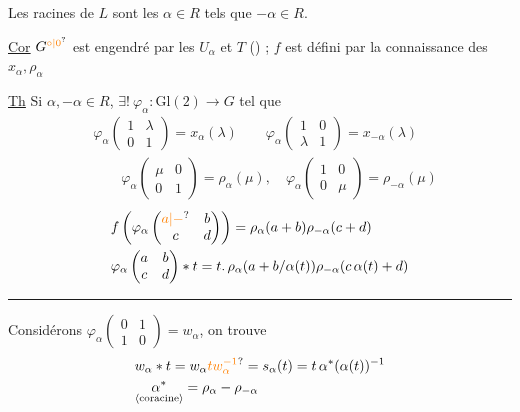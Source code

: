 Les racines de $L$ sont les $\alpha\in R$ tels que $-\alpha\in R$.

\uline{Cor}  $G^{\unsure{\circ|0}}$ est engendré par les $U_\alpha$ et $T$ () ; $f$ est défini  par la connaissance des $x_\alpha,\rho_\alpha$

\uline{Th} Si $\alpha,-\alpha\in R$, $\exists !\ \varphi_\alpha:\mathrm{Gl}(2)\longrightarrow G$ tel que
\[
\begin{aligned}
&\varphi_\alpha\begin{pmatrix}1&\lambda\\0&1\end{pmatrix}=x_\alpha(\lambda)
 \qquad \varphi_\alpha\begin{pmatrix}1&0\\\lambda&1\end{pmatrix}=x_{-\alpha}(\lambda)\\
&\qquad\varphi_\alpha\begin{pmatrix}\mu&0\\0&1\end{pmatrix}=\rho_\alpha(\mu),\quad
\varphi_\alpha\begin{pmatrix}1&0\\0&\mu\end{pmatrix}=\rho_{-\alpha}(\mu)
\end{aligned}
\]
\[
\begin{aligned}
&f\left(\varphi_\alpha\begin{pmatrix}\unsure{a|-}&b\\c&d\end{pmatrix}\right)
=\rho_\alpha(a+b)\rho_{-\alpha}(c+d)\\
&\varphi_\alpha\begin{pmatrix}a&b\\c&d\end{pmatrix}*t
=t.\,\rho_\alpha(a+b/\alpha(t))\rho_{-\alpha}(c\,\alpha(t)+d)
\end{aligned}
\]
\begin{center}\rule{1.25cm}{.35pt}\end{center}

\uline{} Considérons $\varphi_\alpha\begin{pmatrix}0&1\\1&0\end{pmatrix}=w_\alpha$, on trouve
\[
\begin{aligned}
&w_\alpha*t=w_\alpha\unsure{t w_\alpha^{-1}}=s_\alpha(t)=t\,\alpha^*(\alpha(t))^{-1}\\
&\underset{\text{\inserted{coracine}}}{\alpha^*}=\rho_\alpha-\rho_{-\alpha}
\end{aligned}
\]

